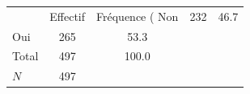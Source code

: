 {
\def\sym#1{\ifmmode^{#1}\else\(^{#1}\)\fi}
\begin{tabular}{l*{1}{cc}}
\toprule
            &    Effectif&Fréquence (%
\midrule
Non         &         232&        46.7\\
Oui         &         265&        53.3\\
Total       &         497&       100.0\\
\midrule
\(N\)       &         497&            \\
\bottomrule
\end{tabular}
}
